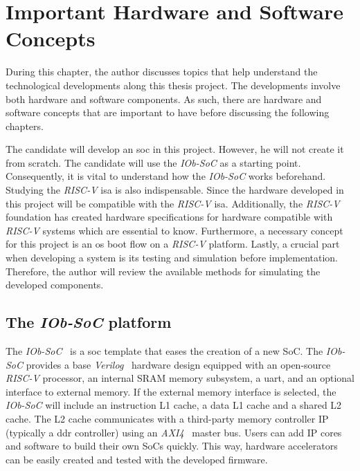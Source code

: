 \chapter{Important Hardware and Software Concepts}
\label{chapter:must_have_concepts}
During this chapter, the author discusses topics that help understand the technological developments along this thesis project. The developments involve both hardware and software components. As such, there are hardware and software concepts that are important to have before discussing the following chapters.

The candidate will develop an \acrshort{soc} in this project. However, he will not create it from scratch. The candidate will use the \textit{IOb-SoC} as a starting point. Consequently, it is vital to understand how the \textit{IOb-SoC} works beforehand. Studying the \textit{RISC-V} \acrfull{isa} is also indispensable. Since the hardware developed in this project will be compatible with the \textit{RISC-V} \acrshort{isa}. Additionally, the \textit{RISC-V} foundation has created hardware specifications for hardware compatible with \textit{RISC-V} systems which are essential to know. Furthermore, a necessary concept for this project is an \acrfull{os} boot flow on a \textit{RISC-V} platform. Lastly, a crucial part when developing a system is its testing and simulation before implementation. Therefore, the author will review the available methods for simulating the developed components.

\section{The \textit{IOb-SoC} platform}
\label{section:iob_soc_template}
The \textit{IOb-SoC}~\cite{iob_soc} is a \acrfull{soc} template that eases the creation of a new SoC. The \textit{IOb-SoC} provides a base \textit{Verilog}~\cite{thomas2008verilog} hardware design equipped with an open-source \textit{RISC-V} processor, an internal SRAM memory subsystem, a \acrshort{uart}, and an optional interface to external memory. If the external memory interface is selected, the \textit{IOb-SoC} will include an instruction L1 cache, a data L1 cache and a shared L2 cache. The L2 cache communicates with a third-party memory controller IP (typically a \acrshort{ddr} controller) using an \textit{AXI4}~\cite{tidala2018high} master bus. Users can add IP cores and software to build their own SoCs quickly. This way, hardware accelerators can be easily created and tested with the developed firmware.

